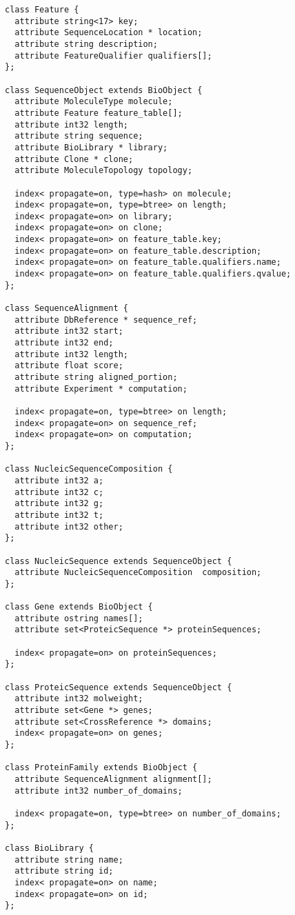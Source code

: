\begin{verbatim}
class Feature {
  attribute string<17> key;
  attribute SequenceLocation * location;
  attribute string description;
  attribute FeatureQualifier qualifiers[];
};

class SequenceObject extends BioObject {
  attribute MoleculeType molecule;
  attribute Feature feature_table[];
  attribute int32 length;
  attribute string sequence;
  attribute BioLibrary * library;
  attribute Clone * clone;
  attribute MoleculeTopology topology;

  index< propagate=on, type=hash> on molecule;
  index< propagate=on, type=btree> on length;
  index< propagate=on> on library;
  index< propagate=on> on clone;
  index< propagate=on> on feature_table.key;
  index< propagate=on> on feature_table.description;
  index< propagate=on> on feature_table.qualifiers.name;
  index< propagate=on> on feature_table.qualifiers.qvalue;
};

class SequenceAlignment {
  attribute DbReference * sequence_ref;
  attribute int32 start;
  attribute int32 end;
  attribute int32 length;
  attribute float score;
  attribute string aligned_portion;
  attribute Experiment * computation;

  index< propagate=on, type=btree> on length;
  index< propagate=on> on sequence_ref;
  index< propagate=on> on computation;
};

class NucleicSequenceComposition {
  attribute int32 a;
  attribute int32 c;
  attribute int32 g;
  attribute int32 t;
  attribute int32 other;
};

class NucleicSequence extends SequenceObject {
  attribute NucleicSequenceComposition  composition;
};

class Gene extends BioObject {
  attribute ostring names[];
  attribute set<ProteicSequence *> proteinSequences;

  index< propagate=on> on proteinSequences;
};

class ProteicSequence extends SequenceObject {
  attribute int32 molweight;
  attribute set<Gene *> genes;
  attribute set<CrossReference *> domains;
  index< propagate=on> on genes;
};

class ProteinFamily extends BioObject {
  attribute SequenceAlignment alignment[];
  attribute int32 number_of_domains;

  index< propagate=on, type=btree> on number_of_domains;
};

class BioLibrary {
  attribute string name;
  attribute string id;
  index< propagate=on> on name;
  index< propagate=on> on id;
};


\end{verbatim}
